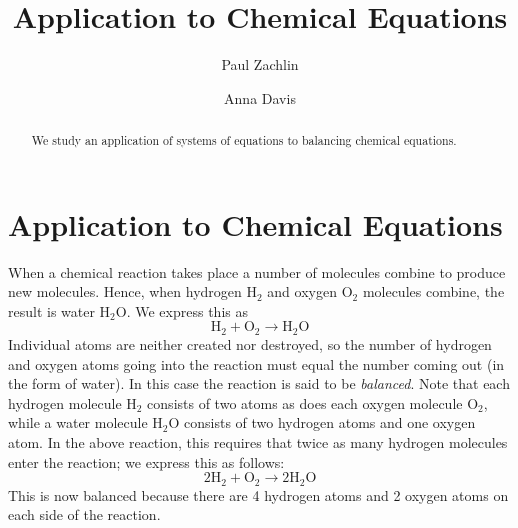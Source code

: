 \documentclass{ximera}
\author{Paul Zachlin \and Anna Davis} \title{Application to Chemical Equations} \license{CC-BY 4.0}
\begin{document}
\begin{abstract}
 We study an application of systems of equations to balancing chemical equations.
\end{abstract}
\maketitle

\section*{Application to Chemical Equations}
When a chemical reaction takes place a number of molecules combine to produce new molecules. Hence, when hydrogen $\mbox{H}_2$ and oxygen $\mbox{O}_2$ molecules combine, the result is water $\mbox{H}_2\mbox{O}$. We express this as
\begin{equation*}
\mbox{H}_2 + \mbox{O}_2 \rightarrow \mbox{H}_2\mbox{O}
\end{equation*}
Individual atoms are neither created nor destroyed, so the number of hydrogen and oxygen atoms going into the reaction must equal the number coming out (in the form of water). In
this case the reaction is said to be \textit{balanced}. Note that each hydrogen molecule $\mbox{H}_2$ consists of two atoms as does each oxygen molecule $\mbox{O}_2$, while a water molecule $\mbox{H}_2\mbox{O}$ consists of two hydrogen atoms and one oxygen atom. In the above reaction, this requires that twice as many hydrogen molecules enter the reaction; we express this as follows:
\begin{equation*}
2\mbox{H}_2 + \mbox{O}_2 \rightarrow 2\mbox{H}_2\mbox{O}
\end{equation*}
This is now balanced because there are 4 hydrogen atoms and 2 oxygen atoms on each side of the reaction.
\end{document}
